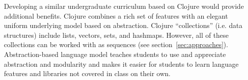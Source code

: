 \documentclass[submission,copyright,creativecommons]{eptcs}
\newcommand{\allcomments}[1]{{#1}}
\newcommand{\elenacomment}[1]{{\bf \textcolor{ForestGreen}{\allcomments{{#1}}}}}
\newcommand{\stephencomment}[1]{{\bf \color{StephensBlue}{\allcomments{{#1}}}}} %
\newcommand{\joecomment}[1]{{\bf \color{JoesGold}{\allcomments{{#1}}}}}
\begin{document}
Developing a similar undergraduate curriculum based on Clojure would provide additional benefits. 
Clojure combines a rich set of features %
with an elegant uniform underlying model based on abstraction. Clojure ``collections'' (i.e. data structures) include lists, vectors, sets, and hashmaps. However, 
all of these collections can be worked with as sequences (see section~\ref{sec:approaches}). 
Abstraction-based language model teaches students to use and appreciate abstraction and modularity
and  makes it easier for students to learn language features and libraries not covered in class on their own. 
\end{document}
